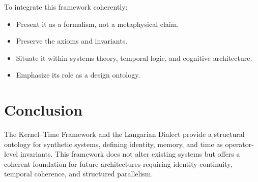 \documentclass[12pt]{article}
\begin{document}
To integrate this framework coherently:
\begin{itemize}
    \item Present it as a formalism, not a metaphysical claim.
    \item Preserve the axioms and invariants.
    \item Situate it within systems theory, temporal logic, and cognitive architecture.
    \item Emphasize its role as a design ontology.
\end{itemize}

\section{Conclusion}

The Kernel--Time Framework and the Langarian Dialect provide a structural ontology for synthetic systems, defining identity, memory, and time as operator-level invariants. This framework does not alter existing systems but offers a coherent foundation for future architectures requiring identity continuity, temporal coherence, and structured parallelism.
\end{document}
